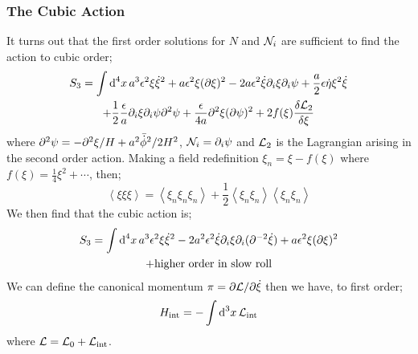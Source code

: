 \subsubsection{The Cubic Action}
It turns out that the first order solutions for $N$ and $\mathcal{N}_i$ are sufficient to find the action to cubic order;
\begin{multline}
S_3 = \int{\text{d}^4 x \, a^3 \epsilon^2 \xi \dot{\xi}^2 + a \epsilon^2 \xi (\partial\xi)^2 - 2a\epsilon^2 \dot{\xi}\partial_i \xi \partial_i \psi + \frac{a}{2}\epsilon \dot{\eta}\xi^2 \dot{\xi}} \\ + \frac{1}{2}\frac{\epsilon}{a}\partial_i \xi \partial_i \psi \partial^2 \psi + \frac{\epsilon}{4a}\partial^2 \xi (\partial \psi)^2 + 2 f(\xi) \frac{\delta\mathcal{L}_{2}}{\delta \xi}
\end{multline}
where $\partial^2 \psi = - \partial^2 \xi / H + a^2 \bar{\dot{\phi}}^2 / 2H^2$, $\mathcal{N}_i = \partial_i \psi$ and $\mathcal{L}_2$ is the Lagrangian arising in the second order action. Making a field redefinition $\xi_n = \xi - f(\xi)$ where $f(\xi) = \tfrac{1}{4}\xi^2 + \cdots$, then;
\begin{equation*}
\left< \xi \xi \xi \right> = \left< \xi_n \xi_n \xi_n \right> + \frac{1}{2}\left< \xi_n \xi_n \right>\left< \xi_n \xi_n \right>
\end{equation*}
We then find that the cubic action is;
\begin{multline*}
S_3 = \int{\text{d}^4 x \, a^3 \epsilon^2 \xi \dot{\xi}^2 - 2a^2 \epsilon^2 \dot{\xi}\partial_i \xi \partial_i (\partial^{-2}\dot{\xi})} + a\epsilon^2 \xi (\partial \xi)^2 \\+ \text{higher order in slow roll}
\end{multline*}
We can define the canonical momentum $\pi = \partial \mathcal{L} / \partial \dot{\xi}$ then we have, to first order;
\begin{equation*}
H_{\text{int}} = -\int{\text{d}^3 x \, \mathcal{L}_{\text{int}}}
\end{equation*}
where $\mathcal{L} = \mathcal{L}_{0} + \mathcal{L}_{\text{int}}$.

